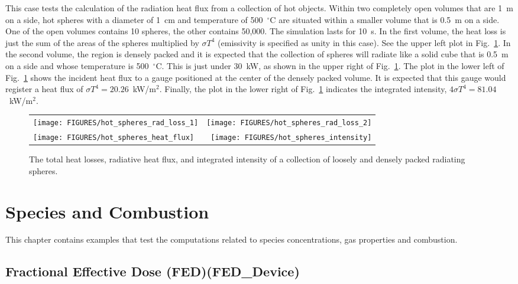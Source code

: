 \documentclass[11pt]{book}
\begin{document}
This case tests the calculation of the radiation heat flux from a collection of hot objects. Within two
completely open volumes that are 1~m on a side, hot spheres with a diameter of 1~cm and temperature of 500~$^\circ$C are
situated within a smaller volume that is 0.5~m on a side. One of the open volumes contains 10 spheres, the other contains
50,000. The simulation lasts for
10~s. In the first volume, the heat loss is just the sum
of the areas of the spheres multiplied by $\sigma T^4$ (emissivity is specified as unity in this case). See
the upper left plot in Fig.~\ref{hot_spheres_plot}. In the second
volume, the region is densely packed and it is expected that the collection of spheres will radiate like a solid cube  that is
0.5~m on a side and whose temperature is 500~$^\circ$C. This is just under 30~kW, as
shown in the upper right of Fig.~\ref{hot_spheres_plot}. The plot in the lower left of Fig.~\ref{hot_spheres_plot}
shows the incident heat flux to a gauge positioned at the center of the densely packed volume.
It is expected that this gauge would register a heat flux of
$\sigma T^4=20.26$~kW/m$^2$. Finally, the plot in the lower right of Fig.~\ref{hot_spheres_plot} indicates the
integrated intensity, $4 \sigma T^4=81.04$~kW/m$^2$.


\noindent
\begin{figure}[h]
\begin{tabular*}{\textwidth}{lr}
\texttt{[image: FIGURES/hot\_spheres\_rad\_loss\_1]} &
\texttt{[image: FIGURES/hot\_spheres\_rad\_loss\_2]} \\
\texttt{[image: FIGURES/hot\_spheres\_heat\_flux]}  &
\texttt{[image: FIGURES/hot\_spheres\_intensity]}
\end{tabular*}
\caption[Radiation from hot spheres]{The total heat losses, radiative heat flux, and integrated intensity of a collection
of loosely and densely packed radiating spheres.}
\label{hot_spheres_plot}
\end{figure}



\chapter{Species and Combustion}

This chapter contains examples that test the computations related to species concentrations, gas properties and combustion.

\section{Fractional Effective Dose (FED)(\texorpdfstring{{\bf FED\_Device}}{FED\_Device}) }
\end{document}
